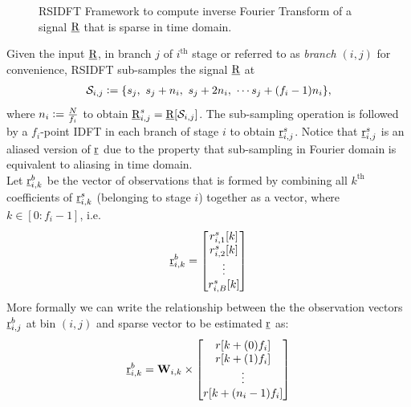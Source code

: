 \begin{enumerate}
	 \begin{figure}[h!]
	 	\begin{center}
	 	\resizebox{0.6\textwidth}{!}{}
	 	\end{center}	   
	 	\caption{ RSIDFT Framework to compute inverse Fourier Transform of a signal $\underline{\mathrm{R}}$ that is sparse in time domain. }\label{fig:rsidft}
	\vspace{5 pt}
	 \end{figure}
	 	
	 Given the input $\underline{\mathrm{R}}$, in branch $j$ of $i^{\text{th}}$ stage or referred to as \textit{branch $(i,j)$} for convenience, RSIDFT sub-samples the signal $\underline{\mathrm{R}}$ at
\begin{align}
\label{Eqn:SamplingSets}
	 \mathcal{S}_{i,j} \mathrel{\mathop:}= \{s_j,\ s_j + n_i,\ s_j + 2n_i,\ \cdots s_j + (f_i-1) n_i\},
\end{align}
where $n_i\mathrel{\mathop:}= \frac{N}{f_i}$ to obtain $\underline{\mathrm{R}}^{s}_{i,j}=\underline{\mathrm{R}}[\mathcal{S}_{i,j}]$. The sub-sampling operation is followed by a $f_i$-point IDFT in each branch of stage $i$ to obtain $ \underline{\mathrm{r}}^{s}_{i,j}$. Notice that $ \underline{\mathrm{r}}^{s}_{i,j}$ is an aliased version of $\underline{\mathrm{r}}$ due to the property that sub-sampling in Fourier domain is equivalent to aliasing in time domain.\\

	 Let $\underline{\mathrm{r}}^{b}_{i,k}$ be the  vector of observations that is formed by combining all $k^{\text{th}}$ coefficients of $\underline{\mathrm{r}}^{s}_{i,k}$ (belonging to stage $i$) together as a vector, where $k\in [0:f_i-1]$, i.e.
\[
	  \underline{\mathrm{r}}^{b}_{i,k} = \begin{bmatrix}
	 r^{s}_{i,1}[k] \\
	 r^{s}_{i,2}[k] \\
	 \vdots\\
	 r^{s}_{i,B}[k]
	 \end{bmatrix}  
\]
More formally we can write the relationship between the the observation vectors $\underline{\mathrm{r}}^b_{i,j}$ at bin $(i,j)$ and sparse vector to be estimated $\underline{\mathrm{r}}$ as:
\begin{align}
	\label{Eqn:Generator Equation}
	\underline{\mathrm{r}}^b_{i,k}= \mathbf{W}_{i,k} \times
	\begin{bmatrix}
		r[k+(0)f_i] \\
		r[k+(1)f_i] \\
		\vdots\\
		r[k+(n_i-1)f_i]
	\end{bmatrix}
\end{align}


\end{enumerate}
